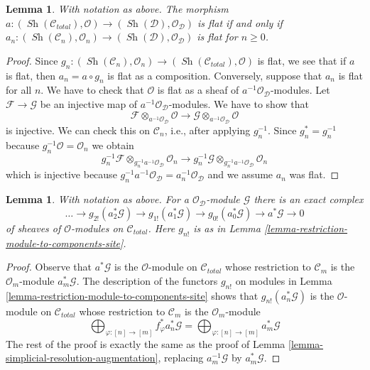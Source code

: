 \documentclass{stacks-project}
\theoremstyle{plain}
\newtheorem{lemma}[subsection]{Lemma}
\theoremstyle{definition}
\theoremstyle{remark}
\numberwithin{equation}{subsection}
\def\Sh{\mathop{\mathit{Sh}}\nolimits}
\begin{document}
\begin{lemma}
\label{lemma-flat-augmentation-modules}
With notation as above. The morphism
$a : (\Sh(\mathcal{C}_{total}), \mathcal{O}) \to
(\Sh(\mathcal{D}), \mathcal{O}_\mathcal{D})$
is flat if and only if
$a_n : (\Sh(\mathcal{C}_n), \mathcal{O}_n) \to
(\Sh(\mathcal{D}), \mathcal{O}_\mathcal{D})$
is flat for $n \geq 0$.
\end{lemma}

\begin{proof}
Since $g_n : (\Sh(\mathcal{C}_n), \mathcal{O}_n) \to
(\Sh(\mathcal{C}_{total}), \mathcal{O})$ is flat, we see
that if $a$ is flat, then $a_n = a \circ g_n$ is flat as
a composition. Conversely, suppose that $a_n$ is flat for all $n$.
We have to check that $\mathcal{O}$ is flat as a sheaf of
$a^{-1}\mathcal{O}_\mathcal{D}$-modules. Let $\mathcal{F} \to \mathcal{G}$
be an injective map of $a^{-1}\mathcal{O}_\mathcal{D}$-modules.
We have to show that
$$
\mathcal{F} \otimes_{a^{-1}\mathcal{O}_\mathcal{D}} \mathcal{O}
\to
\mathcal{G} \otimes_{a^{-1}\mathcal{O}_\mathcal{D}} \mathcal{O}
$$
is injective. We can check this on $\mathcal{C}_n$, i.e., after
applying $g_n^{-1}$. Since $g_n^* = g_n^{-1}$ because
$g_n^{-1}\mathcal{O} = \mathcal{O}_n$ we obtain
$$
g_n^{-1}\mathcal{F} \otimes_{g_n^{-1}a^{-1}\mathcal{O}_\mathcal{D}}
\mathcal{O}_n
\to
g_n^{-1}\mathcal{G} \otimes_{g_n^{-1}a^{-1}\mathcal{O}_\mathcal{D}}
\mathcal{O}_n
$$
which is injective because
$g_n^{-1}a^{-1}\mathcal{O}_\mathcal{D} = a_n^{-1}\mathcal{O}_\mathcal{D}$
and we assume $a_n$ was flat.
\end{proof}

\begin{lemma}
\label{lemma-simplicial-resolution-augmentation-modules}
With notation as above. For a $\mathcal{O}_\mathcal{D}$-module $\mathcal{G}$
there is an exact complex
$$
\ldots \to
g_{2!}(a_2^*\mathcal{G}) \to
g_{1!}(a_1^*\mathcal{G}) \to
g_{0!}(a_0^*\mathcal{G}) \to
a^*\mathcal{G} \to 0
$$
of sheaves of $\mathcal{O}$-modules on $\mathcal{C}_{total}$.
Here $g_{n!}$ is as in Lemma \ref{lemma-restriction-module-to-components-site}.
\end{lemma}

\begin{proof}
Observe that $a^*\mathcal{G}$ is the $\mathcal{O}$-module on
$\mathcal{C}_{total}$ whose restriction to $\mathcal{C}_m$
is the $\mathcal{O}_m$-module $a_m^*\mathcal{G}$.
The description of the functors $g_{n!}$ on modules
in Lemma \ref{lemma-restriction-module-to-components-site}
shows that $g_{n!}(a_n^*\mathcal{G})$ is the
$\mathcal{O}$-module on $\mathcal{C}_{total}$
whose restriction to $\mathcal{C}_m$ is the $\mathcal{O}_m$-module
$$
\bigoplus\nolimits_{\varphi : [n] \to [m]} f_\varphi^*a_n^*\mathcal{G} =
\bigoplus\nolimits_{\varphi : [n] \to [m]} a_m^*\mathcal{G}
$$
The rest of the proof is exactly the same as the proof of
Lemma \ref{lemma-simplicial-resolution-augmentation},
replacing $a_m^{-1}\mathcal{G}$ by $a_m^*\mathcal{G}$.
\end{proof}
\end{document}
